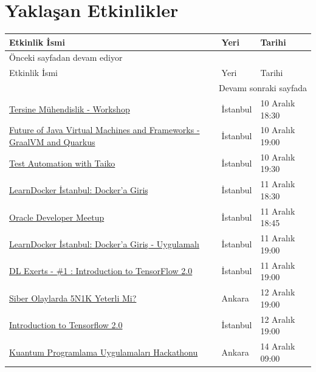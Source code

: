 \documentclass[11pt]{article}
\begin{document}
\section{Yaklaşan Etkinlikler}
\label{sec:org6b35be6}
\begin{longtable}{|p{8cm}|l|l|}
\hline
Etkinlik İsmi & Yeri & Tarihi\\
\hline
\endfirsthead
\multicolumn{3}{l}{Önceki sayfadan devam ediyor} \\
\hline

Etkinlik İsmi & Yeri & Tarihi \\

\hline
\endhead
\hline\multicolumn{3}{r}{Devamı sonraki sayfada} \\
\endfoot
\endlastfoot
\hline
\href{https://www.eventbrite.com/e/tersine-muhendislik-workshop-tickets-84404653591}{Tersine Mühendislik - Workshop} & İstanbul & 10 Aralık 18:30\\
\href{https://www.meetup.com/tr-TR/Istanbul-Java-User-Group/events/265809996/}{Future of Java Virtual Machines and Frameworks - GraalVM and Quarkus} & İstanbul & 10 Aralık 19:00\\
\href{https://www.meetup.com/tr-TR/TestHive/events/266285658/}{Test Automation with Taiko} & İstanbul & 10 Aralık 19:30\\
\href{https://www.meetup.com/tr-TR/ING-\%25C4\%25B0novasyon-Merkezi/events/266930475/}{LearnDocker İstanbul: Docker'a Giriş} & İstanbul & 11 Aralık 18:30\\
\href{https://www.meetup.com/tr-TR/Oracle-Developer-Meetup-Istanbul/events/266783829/}{Oracle Developer Meetup} & İstanbul & 11 Aralık 18:45\\
\href{https://www.meetup.com/tr-TR/Docker-Istanbul/events/266413178/}{LearnDocker İstanbul: Docker'a Giriş - Uygulamalı} & İstanbul & 11 Aralık 19:00\\
\href{https://www.meetup.com/tr-TR/DL\_Experts\_Ist/events/266781111/}{DL Exerts - \#1 : Introduction to TensorFlow 2.0} & İstanbul & 11 Aralık 19:00\\
\href{https://www.eventbrite.com/e/siber-olaylarda-5n1k-yeterli-mi-hacknightsorg-tickets-78022424171}{Siber Olaylarda 5N1K Yeterli Mi?} & Ankara & 12 Aralık 19:00\\
\href{https://www.meetup.com/tr-TR/Emlakjet-Engineering/events/266403417/}{Introduction to Tensorflow 2.0} & İstanbul & 12 Aralık 19:00\\
\href{https://www.eventbrite.com/e/kuantum-programlama-uygulamalar-hackathonu-tickets-84534931255}{Kuantum Programlama Uygulamaları Hackathonu} & Ankara & 14 Aralık 09:00\\

\end{longtable}
\end{document}
